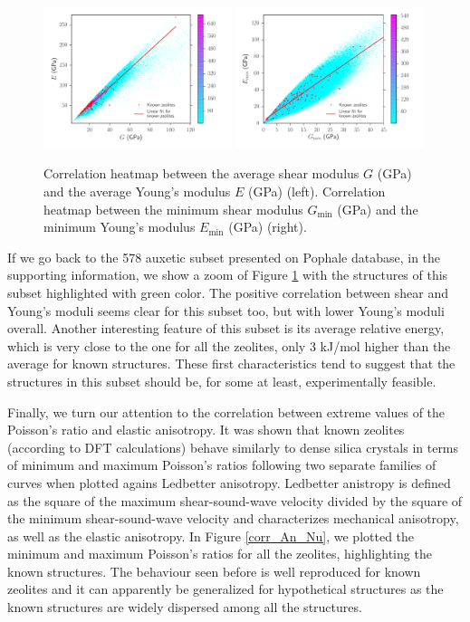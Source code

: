 \documentclass[journal=jacsat,manuscript=article]{achemso}
\newcommand\e[1]{\ensuremath{_{\text{#1}}}}
\begin{document}
\begin{figure}[ht!]\centering
\includegraphics[clip,trim=0.7cm 0.7cm 1.3cm 0.7cm,width=0.49\textwidth]{deem_database_19_1}
\includegraphics[clip,trim=0.5cm 0.7cm 1.5cm 0.7cm,width=0.49\textwidth]{deem_database_19_2}
\caption{Correlation heatmap between the average shear modulus $G$ (GPa) and the average Young's modulus $E$ (GPa) (left). Correlation heatmap between the minimum shear modulus $G$\e{min} (GPa) and the minimum Young's modulus $E$\e{min} (GPa) (right).
\label{corr_G_E}}
\end{figure}
If we go back to the 578 auxetic subset presented on Pophale database, in the supporting information, we show a zoom of Figure \ref{corr_G_E} with the structures of this subset highlighted with green color. The positive correlation between shear and Young's moduli seems clear for this subset too, but with lower Young's moduli overall. Another interesting feature of this subset is its average relative energy, which is very close to the one for all the zeolites, only 3 kJ/mol higher than the average for known structures. These first characteristics tend to suggest that the structures in this subset should be, for some at least, experimentally feasible.
		
Finally, we turn our attention to the correlation between extreme values of the Poisson's ratio and elastic anisotropy. It was shown that known zeolites (according to DFT calculations) behave similarly to dense silica crystals in terms of minimum and maximum Poisson's ratios following two separate families of curves when plotted agains Ledbetter anisotropy.\cite{Siddorn2015} Ledbetter anistropy is defined as the square of the maximum shear-sound-wave velocity divided by the square of the minimum shear-sound-wave velocity and characterizes mechanical anisotropy, as well as the elastic anisotropy. In Figure \ref{corr_An_Nu}, we plotted the minimum and maximum Poisson's ratios for all the zeolites, highlighting the known structures. The behaviour seen before is well reproduced for known zeolites and it can apparently be generalized for hypothetical structures as the known structures are widely dispersed among all the structures.
		
\end{document}
